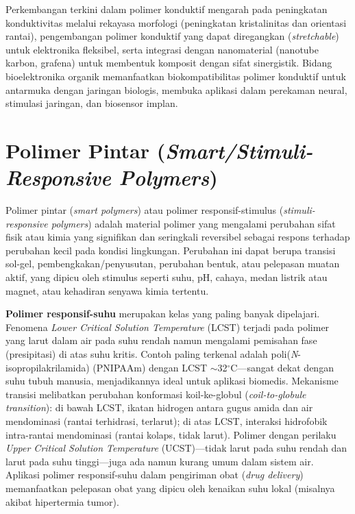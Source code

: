 \documentclass[12pt,a4paper,openany]{book}
\begin{document}
Perkembangan terkini dalam polimer konduktif mengarah pada peningkatan konduktivitas melalui rekayasa morfologi (peningkatan kristalinitas dan orientasi rantai), pengembangan polimer konduktif yang dapat diregangkan (\textit{stretchable}) untuk elektronika fleksibel, serta integrasi dengan nanomaterial (nanotube karbon, grafena) untuk membentuk komposit dengan sifat sinergistik. Bidang bioelektronika organik memanfaatkan biokompatibilitas polimer konduktif untuk antarmuka dengan jaringan biologis, membuka aplikasi dalam perekaman neural, stimulasi jaringan, dan biosensor implan.

\section{Polimer Pintar (\textit{Smart/Stimuli-Responsive Polymers})}

Polimer pintar (\textit{smart polymers}) atau polimer responsif-stimulus (\textit{stimuli-responsive polymers}) adalah material polimer yang mengalami perubahan sifat fisik atau kimia yang signifikan dan seringkali reversibel sebagai respons terhadap perubahan kecil pada kondisi lingkungan. Perubahan ini dapat berupa transisi sol-gel, pembengkakan/penyusutan, perubahan bentuk, atau pelepasan muatan aktif, yang dipicu oleh stimulus seperti suhu, pH, cahaya, medan listrik atau magnet, atau kehadiran senyawa kimia tertentu.

\textbf{Polimer responsif-suhu} merupakan kelas yang paling banyak dipelajari. Fenomena \textit{Lower Critical Solution Temperature} (LCST) terjadi pada polimer yang larut dalam air pada suhu rendah namun mengalami pemisahan fase (presipitasi) di atas suhu kritis. Contoh paling terkenal adalah poli(\textit{N}-isopropilakrilamida) (PNIPAAm) dengan LCST $\sim$32$^{\circ}$C---sangat dekat dengan suhu tubuh manusia, menjadikannya ideal untuk aplikasi biomedis. Mekanisme transisi melibatkan perubahan konformasi koil-ke-globul (\textit{coil-to-globule transition}): di bawah LCST, ikatan hidrogen antara gugus amida dan air mendominasi (rantai terhidrasi, terlarut); di atas LCST, interaksi hidrofobik intra-rantai mendominasi (rantai kolaps, tidak larut). Polimer dengan perilaku \textit{Upper Critical Solution Temperature} (UCST)---tidak larut pada suhu rendah dan larut pada suhu tinggi---juga ada namun kurang umum dalam sistem air. Aplikasi polimer responsif-suhu dalam pengiriman obat (\textit{drug delivery}) memanfaatkan pelepasan obat yang dipicu oleh kenaikan suhu lokal (misalnya akibat hipertermia tumor).
\end{document}
